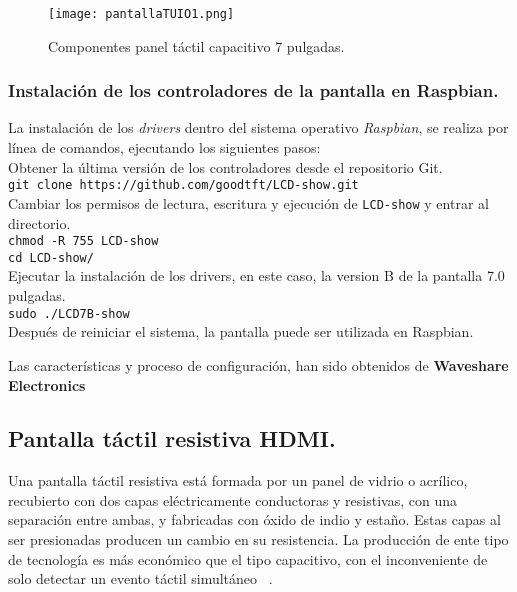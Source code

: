 \begin{figure}[!h]
\begin{center}
\texttt{[image: pantallaTUIO1.png]}
\caption{Componentes panel táctil capacitivo 7 pulgadas.}
\label{fig:PropPantalla7}
\end{center}
\end{figure}

\subsubsection{Instalación de los controladores de la pantalla en Raspbian.}

La instalación de los \emph{drivers} dentro del sistema operativo \emph{Raspbian}, se realiza por línea de comandos, ejecutando los siguientes pasos:\\
Obtener la última versión de los controladores desde el repositorio Git.\\
\colorbox[gray]{0.85}{\texttt{git clone https://github.com/goodtft/LCD-show.git}}\\
Cambiar los permisos de lectura, escritura y ejecución de \texttt{LCD-show} y entrar al directorio.\\
\colorbox[gray]{0.85}{\texttt{chmod -R 755 LCD-show}}\\
\colorbox[gray]{0.85}{\texttt{cd LCD-show/}}\\
Ejecutar la instalación de los drivers, en este caso, la version B de la pantalla 7.0 pulgadas.\\
\colorbox[gray]{0.85}{\texttt{sudo ./LCD7B-show}}\\
Después de reiniciar el sistema, la pantalla puede ser utilizada en Raspbian.

Las características y proceso de configuración, han sido obtenidos de \textbf{ Waveshare Electronics ~\cite{Waveshare}}


\subsection{Pantalla táctil resistiva HDMI.}
\label{subsubs:pantalla3}
Una pantalla táctil resistiva está formada por un panel de vidrio o acrílico, recubierto con dos capas eléctricamente conductoras y resistivas, con una separación entre ambas, y fabricadas con óxido de indio y estaño. Estas capas al ser presionadas producen un cambio en su resistencia. La producción de ente tipo de tecnología es más económico que el tipo capacitivo, con el inconveniente de solo detectar un evento táctil simultáneo ~\cite{Downs}.

